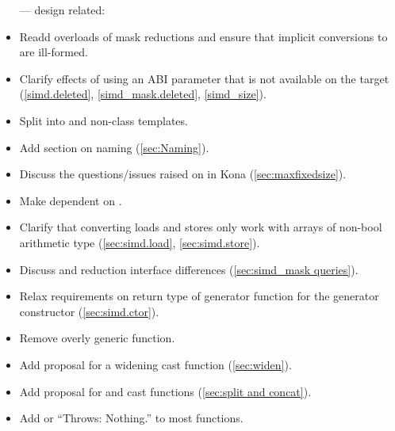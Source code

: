 \begin{itemize}
  \item[---] design related:
  \item Readd \bool overloads of mask reductions and ensure that implicit conversions to \bool are ill-formed.
  \item Clarify effects of using an ABI parameter that is not available on the target (\ref{simd.deleted}, \ref{simd_mask.deleted}, \ref{simd_size}).
  \item Split \whereexpression into \const and non-\const class templates.
  \item Add section on naming (\autoref{sec:Naming}).
  \item Discuss the questions/issues raised on  in Kona (\autoref{sec:maxfixedsize}).
  \item Make  dependent on .
  \item Clarify that converting loads and stores only work with arrays of non-bool arithmetic type (\ref{sec:simd.load}, \ref{sec:simd.store}).
  \item Discuss \mask and  reduction interface differences (\autoref{sec:simd_mask queries}).
  \item Relax requirements on return type of generator function for the generator constructor (\ref{sec:simd.ctor}).
  \item Remove overly generic  function.
  \item Add proposal for a widening cast function (\autoref{sec:widen}).
  \item Add proposal for  and  cast functions (\autoref{sec:split and concat}).
  \item Add  or “Throws: Nothing.” to most functions.


\end{itemize}
